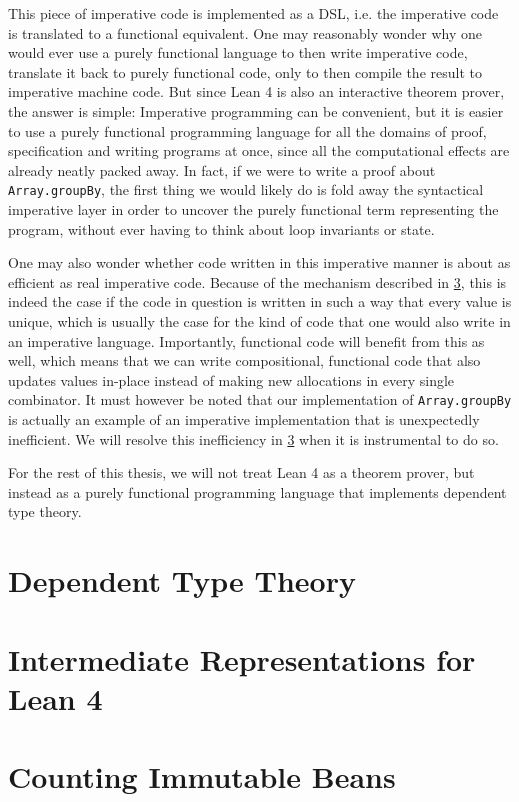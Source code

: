 This piece of imperative code is implemented as a DSL, i.e. the imperative code is translated to a functional equivalent.
One may reasonably wonder why one would ever use a purely functional language to then write imperative code, translate it back to purely functional code, only to then compile the result to imperative machine code. But since Lean 4 is also an interactive theorem prover, the answer is simple: Imperative programming can be convenient, but it is easier to use a purely functional programming language for all the domains of proof, specification and writing programs at once, since all the computational effects are already neatly packed away. In fact, if we were to write a proof about \lstinline|Array.groupBy|, the first thing we would likely do is fold away the syntactical imperative layer in order to uncover the purely functional term representing the program, without ever having to think about loop invariants or state.

One may also wonder whether code written in this imperative manner is about as efficient as real imperative code. Because of the mechanism described in \cref{sec:beans}, this is indeed the case if the code in question is written in such a way that every value is unique, which is usually the case for the kind of code that one would also write in an imperative language. Importantly, functional code will benefit from this as well, which means that we can write compositional, functional code that also updates values in-place instead of making new allocations in every single combinator. It must however be noted that our implementation of \lstinline|Array.groupBy| is actually an example of an imperative implementation that is unexpectedly inefficient. We will resolve this inefficiency in \cref{sec:beans} when it is instrumental to do so.

For the rest of this thesis, we will not treat Lean 4 as a theorem prover, but instead as a purely functional programming language that implements dependent type theory.

\section{Dependent Type Theory}\label{sec:dtt}

\section{Intermediate Representations for Lean 4}\label{sec:irs}

\section{Counting Immutable Beans}\label{sec:beans}

